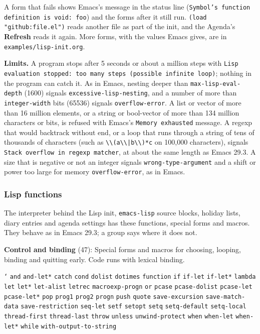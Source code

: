 \documentclass[11pt]{article}
\begin{document}
A form that fails shows Emacs's message in the status line (\texttt{Symbol’s function definition is void: foo}) and the forms after it still run. \texttt{(load "github:file.el")} reads another file as part of the init, and the Agenda's \textbf{Refresh} reads it again. More forms, with the values Emacs gives, are in \texttt{examples/lisp-init.org}.

\textbf{Limits.} A program stops after 5 seconds or about a million steps with \texttt{Lisp evaluation stopped: too many steps (possible infinite loop)}; nothing in the program can catch it. As in Emacs, nesting deeper than \texttt{max-lisp-eval-depth} (1600) signals \texttt{excessive-lisp-nesting}, and a number of more than \texttt{integer-width} bits (65536) signals \texttt{overflow-error}. A list or vector of more than 16 million elements, or a string or bool-vector of more than 134 million characters or bits, is refused with Emacs's \texttt{Memory exhausted} message. A regexp that would backtrack without end, or a loop that runs through a string of tens of thousands of characters (such as \texttt{\textbackslash{}\textbackslash{}(a\textbackslash{}\textbackslash{}|b\textbackslash{}\textbackslash{})*c} on 100,000 characters), signals \texttt{Stack overflow in regexp matcher}, at about the same length as Emacs 29.3. A size that is negative or not an integer signals \texttt{wrong-type-argument} and a shift or power too large for memory \texttt{overflow-error}, as in Emacs.

\subsubsection{Lisp functions}
\label{sec:org8be7fe6}
The interpreter behind the Lisp init, \texttt{emacs-lisp} source blocks, holiday lists, diary entries and agenda settings has these functions, special forms and macros. They behave as in Emacs 29.3; a group says where it does not.

\textbf{Control and binding} (47): Special forms and macros for choosing, looping, binding and quitting early. Code runs with lexical binding.

\texttt{`} \texttt{and} \texttt{and-let*} \texttt{catch} \texttt{cond} \texttt{dolist} \texttt{dotimes} \texttt{function} \texttt{if} \texttt{if-let} \texttt{if-let*} \texttt{lambda} \texttt{let} \texttt{let*} \texttt{let-alist} \texttt{letrec} \texttt{macroexp-progn} \texttt{or} \texttt{pcase} \texttt{pcase-dolist} \texttt{pcase-let} \texttt{pcase-let*} \texttt{pop} \texttt{prog1} \texttt{prog2} \texttt{progn} \texttt{push} \texttt{quote} \texttt{save-excursion} \texttt{save-match-data} \texttt{save-restriction} \texttt{seq-let} \texttt{setf} \texttt{setopt} \texttt{setq} \texttt{setq-default} \texttt{setq-local} \texttt{thread-first} \texttt{thread-last} \texttt{throw} \texttt{unless} \texttt{unwind-protect} \texttt{when} \texttt{when-let} \texttt{when-let*} \texttt{while} \texttt{with-output-to-string}
\end{document}
